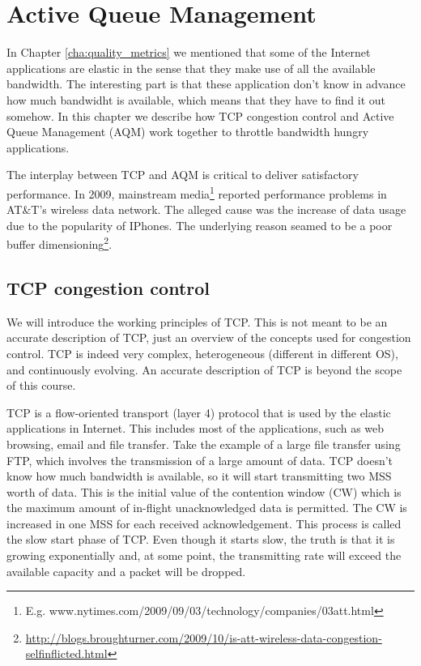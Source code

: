 \chapter{Active Queue Management}

In Chapter \ref{cha:quality_metrics} we mentioned that some of the Internet applications are elastic in the sense that they make use of all the available bandwidth.
The interesting part is that these application don't know in advance how much bandwidht is available, which means that they have to find it out somehow.
In this chapter we describe how TCP congestion control and Active Queue Management (AQM) work together to throttle bandwidth hungry applications.

The interplay between TCP and AQM is critical to deliver satisfactory performance.
In 2009, mainstream media\footnote{E.g. www.nytimes.com/2009/09/03/technology/companies/03att.html} reported performance problems in AT\&T's wireless data network.
The alleged cause was the increase of data usage due to the popularity of IPhones.
The underlying reason seamed to be a poor buffer dimensioning\footnote{\url{http://blogs.broughturner.com/2009/10/is-att-wireless-data-congestion-selfinflicted.html}}.

\section{TCP congestion control}
We will introduce the working principles of TCP.
This is not meant to be an accurate description of TCP, just an overview of the concepts used for congestion control.
TCP is indeed very complex, heterogeneous (different in different OS), and continuously evolving.
An accurate description of TCP is beyond the scope of this course.

TCP is a flow-oriented transport (layer 4) protocol that is used by the elastic applications in Internet.
This includes most of the applications, such as web browsing, email and file transfer.
Take the example of a large file transfer using FTP, which involves the transmission of a large amount of data.
TCP doesn't know how much bandwidth is available, so it will start transmitting two MSS worth of data.
This is the initial value of the contention window (CW) which is the maximum amount of in-flight unacknowledged data is permitted.
The CW is increased in one MSS for each received acknowledgement.
This process is called the slow start phase of TCP.
Even though it starts slow, the truth is that it is growing exponentially and, at some point, the transmitting rate will exceed the available capacity and a packet will be dropped.

